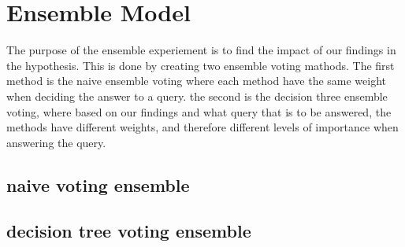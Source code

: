 \section{Ensemble Model}
\label{sec:ensemble_model}
The purpose of the ensemble experiement is to find the impact of our findings in the hypothesis. This is done by creating two ensemble voting mathods. The first method is the naive ensemble voting where each method have the same weight when deciding the answer to a query. the second is the decision three ensemble voting, where based on our findings and what query that is to be answered, the methods have different weights, and therefore different levels of importance when answering the query. 

\subsection{naive voting ensemble}

\subsection{decision tree voting ensemble}